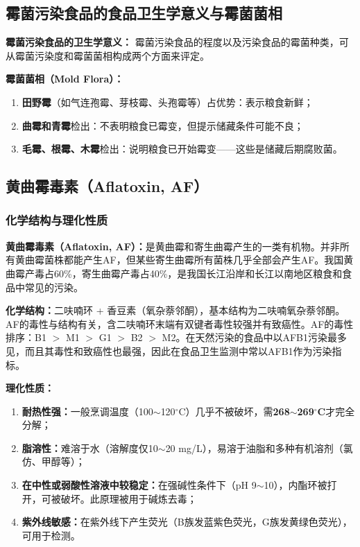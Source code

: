 \subsection{霉菌污染食品的食品卫生学意义与霉菌菌相}

\begin{defbox}
\textbf{霉菌污染食品的卫生学意义：}
霉菌污染食品的程度以及污染食品的霉菌种类，可从霉菌污染度和霉菌菌相构成两个方面来评定。

\textbf{霉菌菌相（Mold Flora）：}
\begin{enumerate}[leftmargin=*]
    \item \textbf{田野霉}（如气连孢霉、芽枝霉、头孢霉等）占优势：表示粮食新鲜；
    \item \textbf{曲霉和青霉}检出：不表明粮食已霉变，但提示储藏条件可能不良；
    \item \textbf{毛霉、根霉、木霉}检出：说明粮食已开始霉变——这些是储藏后期腐败菌。
\end{enumerate}
\end{defbox}

\subsection{黄曲霉毒素（Aflatoxin, AF）}

\subsubsection{化学结构与理化性质}

\begin{keybox}
\textbf{黄曲霉毒素（Aflatoxin, AF）：}是黄曲霉和寄生曲霉产生的一类有机物。并非所有黄曲霉菌株都能产生AF，但某些寄生曲霉所有菌株几乎全部会产生AF。我国黄曲霉产毒占60\%，寄生曲霉产毒占40\%，是我国长江沿岸和长江以南地区粮食和食品中常见的污染。

\textbf{化学结构：}二呋喃环 + 香豆素（氧杂萘邻酮），基本结构为二呋喃氧杂萘邻酮。AF的毒性与结构有关，含二呋喃环末端有双键者毒性较强并有致癌性。AF的毒性排序：B1 $>$ M1 $>$ G1 $>$ B2 $>$ M2。在天然污染的食品中以AFB1污染最多见，而且其毒性和致癌性也最强，因此在食品卫生监测中常以AFB1作为污染指标。

\textbf{理化性质：}
\begin{enumerate}[leftmargin=*]
    \item \textbf{耐热性强：}一般烹调温度（100$\sim$120$^\circ$C）几乎不被破坏，需\textbf{268$\sim$269$^\circ$C}才完全分解；
    \item \textbf{脂溶性：}难溶于水（溶解度仅10$\sim$20 mg/L），易溶于油脂和多种有机溶剂（氯仿、甲醇等）；
    \item \textbf{在中性或弱酸性溶液中较稳定：}在强碱性条件下（pH 9$\sim$10），内酯环被打开，可被破坏。此原理被用于碱炼去毒；
    \item \textbf{紫外线敏感：}在紫外线下产生荧光（B族发蓝紫色荧光，G族发黄绿色荧光），可用于检测。
\end{enumerate}
\end{keybox}

